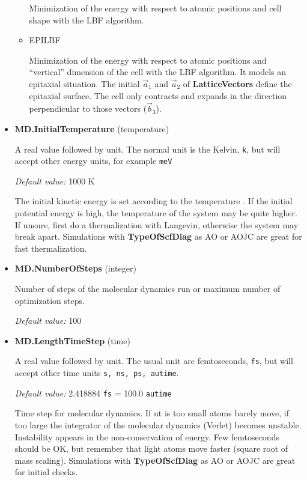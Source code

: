 \documentclass[11pt]{article}
\begin{document}
\begin{itemize}
\begin{itemize}
      Minimization of the energy with respect to atomic positions and cell shape with the LBF algorithm.

      \item{EPILBF}

      Minimization of the energy with respect to atomic positions and ``vertical'' dimension
      of the cell with the LBF algorithm.  It models an epitaxial situation.
      The initial $\vec a_1$ and $\vec a_2$ of {\bf LatticeVectors} define the
      epitaxial surface.  The cell only contracts and expands in the direction perpendicular
      to those vectors ($\vec b_3$).

   \end{itemize}

   \item{\bf MD.InitialTemperature} (temperature)

   A real value followed by unit.  The normal unit is the Kelvin, \texttt{k},
   but will accept other energy units, for example \texttt{meV}

  \textit{Default value:}  1000 K

   The initial kinetic energy is set according to the temperature .
   If the initial potential energy is high, the temperature of the system may be
   quite higher.  If unsure, first do a thermalization with Langevin,
   otherwise the system may break apart.
   Simulations with {\bf TypeOfScfDiag} as AO or AOJC are great for fast thermalization.

   \item{\bf MD.NumberOfSteps} (integer)

   Number of steps of the molecular dynamics run or maximum number of optimization steps.

   \textit{Default value:}  100

   \item{\bf MD.LengthTimeStep} (time)

   A real value followed by unit.  The usual unit are femtoseconds, \texttt{fs},
   but will accept other time units \texttt{s, ns, ps, autime}.

  \textit{Default value:}  2.418884 \texttt{fs} = 100.0 \texttt{autime}

   Time step for molecular dynamics.  If ut is too small atoms barely move, if too large
   the integrator of the molecular dynamics (Verlet) becomes unstable.  Instability
   appears in the non-conservation of energy.  Few femtoseconds should be OK,
   but remember that light atoms move faster (square root of mass scaling).
   Simulations with {\bf TypeOfScfDiag} as AO or AOJC are great for initial checks.


\end{itemize}
\end{document}
